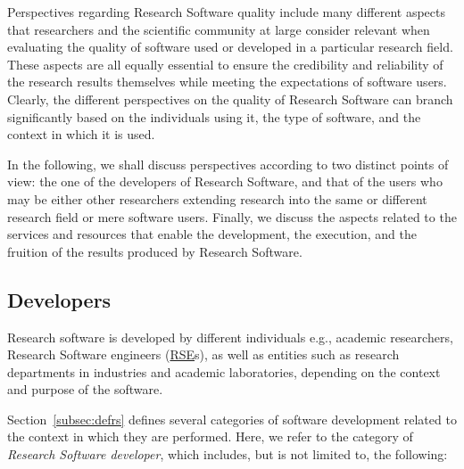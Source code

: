 Perspectives regarding Research Software quality include many different aspects that researchers and the scientific community at large consider relevant when evaluating the quality of software used or developed in a particular research field. These aspects are all equally essential to ensure the credibility and reliability of the research results themselves while meeting the expectations of software users. Clearly, the different perspectives on the quality of Research Software can branch significantly based on the individuals using it, the type of software, and the context in which it is used.

In the following, we shall discuss perspectives according to two distinct points of view: the one of the developers of Research Software, and that of the users who may be either other researchers extending research into the same or different research field or mere software users. Finally, we discuss the aspects related to the services and resources that enable the development, the execution, and the fruition of the results produced by Research Software.

\subsection{Developers}

Research software is developed by different individuals e.g., academic researchers, Research Software engineers (\href{https://society-rse.org/}{RSE}s), as well as entities such as research departments in industries and academic laboratories, depending on the context and purpose of the software.

Section~\ref{subsec:defrs} defines several categories of software development related to the context in which they are performed. Here, we refer to the category of \textit{Research Software developer}, which includes, but is not limited to, the following:

